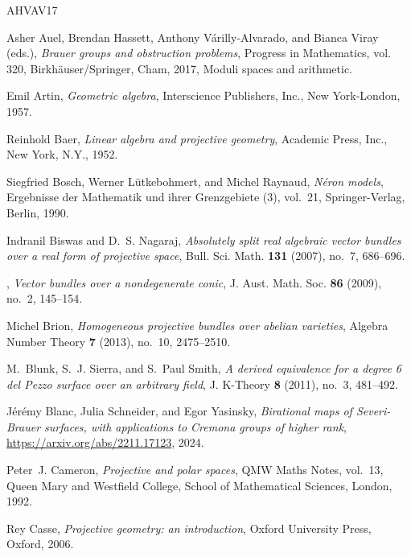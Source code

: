 \documentclass{amsart}
\theoremstyle{definition}
\theoremstyle{remark}
\begin{document}
\begin{thebibliography}{AHVAV17}

Asher Auel, Brendan Hassett, Anthony V\'{a}rilly-Alvarado, and Bianca Viray
  (eds.), \emph{Brauer groups and obstruction problems}, Progress in
  Mathematics, vol. 320, Birkh\"{a}user/Springer, Cham, 2017, Moduli spaces and
  arithmetic. 

Emil Artin, \emph{Geometric algebra}, Interscience Publishers, Inc., New
  York-London, 1957. 

Reinhold Baer, \emph{Linear algebra and projective geometry}, Academic Press,
  Inc., New York, N.Y., 1952. 

Siegfried Bosch, Werner L{\"u}tkebohmert, and Michel Raynaud, \emph{N\'eron
  models}, Ergebnisse der Mathematik und ihrer Grenzgebiete (3), vol.~21,
  Springer-Verlag, Berlin, 1990. 

Indranil Biswas and D.~S. Nagaraj, \emph{Absolutely split real algebraic vector
  bundles over a real form of projective space}, Bull. Sci. Math. \textbf{131}
  (2007), no.~7, 686--696. 

\bysame, \emph{Vector bundles over a nondegenerate conic}, J. Aust. Math. Soc.
  \textbf{86} (2009), no.~2, 145--154. 

Michel Brion, \emph{Homogeneous projective bundles over abelian varieties},
  Algebra Number Theory \textbf{7} (2013), no.~10, 2475--2510. 

M.~Blunk, S.~J. Sierra, and S.~Paul Smith, \emph{A derived equivalence for a
  degree 6 del {P}ezzo surface over an arbitrary field}, J. K-Theory \textbf{8}
  (2011), no.~3, 481--492. 

Jérémy Blanc, Julia Schneider, and Egor Yasinsky, \emph{Birational maps of
  {S}everi-{B}rauer surfaces, with applications to {C}remona groups of higher
  rank}, \url{https://arxiv.org/abs/2211.17123}, 2024.

Peter~J. Cameron, \emph{Projective and polar spaces}, QMW Maths Notes, vol.~13,
  Queen Mary and Westfield College, School of Mathematical Sciences, London,
  1992. 

Rey Casse, \emph{Projective geometry: an introduction}, Oxford University
  Press, Oxford, 2006. 


\end{thebibliography}
\end{document}
